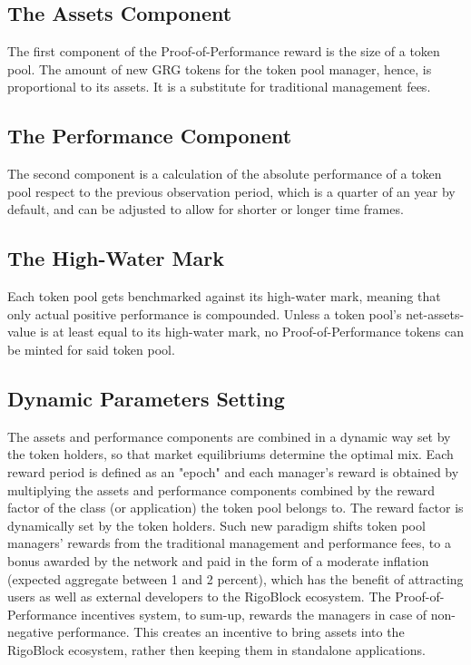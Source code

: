 \documentclass[9pt,oneside]{amsart}
\begin{document}
\begin{multicols}{2}
\subsection{The Assets Component}
The first component of the Proof-of-Performance reward is the size of a token pool. The amount of new GRG tokens for the token pool manager, hence, is proportional to its assets. It is a substitute for traditional management fees.

\subsection{The Performance Component}
The second component is a calculation of the absolute performance of a token pool respect to the previous observation period, which is a quarter of an year by default, and can be adjusted to allow for shorter or longer time frames.

\subsection{The High-Water Mark}
Each token pool gets benchmarked against its high-water mark, meaning that only actual positive performance is compounded. Unless a token pool's net-assets-value is at least equal to its high-water mark, no Proof-of-Performance tokens can be minted for said token pool.

\subsection{Dynamic Parameters Setting}
The assets and performance components are combined in a dynamic way set by the token holders, so that market equilibriums determine the optimal mix. Each reward period is defined as an "epoch" and each manager's reward is obtained by multiplying the assets and performance components combined by the reward factor of the class (or application) the token pool belongs to. The reward factor is dynamically set by the token holders.
Such new paradigm shifts token pool managers' rewards from the traditional management and performance fees, to a bonus awarded by the network and paid in the form of a moderate inflation (expected aggregate between 1 and 2 percent), which has the benefit of attracting users as well as external developers to the RigoBlock ecosystem.
The Proof-of-Performance incentives system, to sum-up, rewards the managers in case of non-negative performance. This creates an incentive to bring assets into the RigoBlock ecosystem, rather then keeping them in standalone applications.


\end{multicols}
\end{document}
